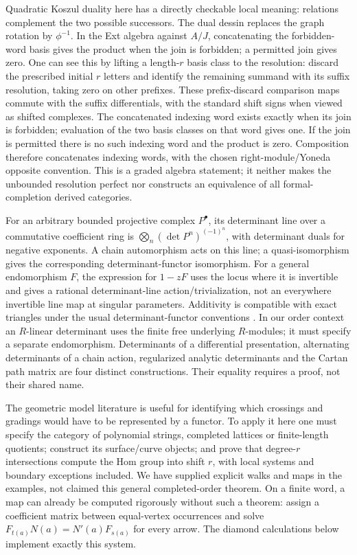 \documentclass[11pt,oneside,openany]{book}
\theoremstyle{definition}\newtheorem{definition}[theorem]{Definition}
\theoremstyle{remark}\newtheorem{remark}[theorem]{Remark}
\begin{document}
Quadratic Koszul duality here has a directly checkable local meaning: relations complement the two possible successors. The dual dessin replaces the graph rotation by $\phi^{-1}$. In the Ext algebra against $A/J$, concatenating the forbidden-word basis gives the product when the join is forbidden; a permitted join gives zero. One can see this by lifting a length-$r$ basis class to the resolution: discard the prescribed initial $r$ letters and identify the remaining summand with its suffix resolution, taking zero on other prefixes. These prefix-discard comparison maps commute with the suffix differentials, with the standard shift signs when viewed as shifted complexes. The concatenated indexing word exists exactly when its join is forbidden; evaluation of the two basis classes on that word gives one. If the join is permitted there is no such indexing word and the product is zero. Composition therefore concatenates indexing words, with the chosen right-module/Yoneda opposite convention. This is a graded algebra statement; it neither makes the unbounded resolution perfect nor constructs an equivalence of all formal-completion derived categories.

For an arbitrary bounded projective complex $P^\bullet$, its determinant line over a commutative coefficient ring is $\bigotimes_n(\det P^n)^{(-1)^n}$, with determinant duals for negative exponents. A chain automorphism acts on this line; a quasi-isomorphism gives the corresponding determinant-functor isomorphism. For a general endomorphism $F$, the expression for $1-zF$ uses the locus where it is invertible and gives a rational determinant-line action/trivialization, not an everywhere invertible line map at singular parameters. Additivity is compatible with exact triangles under the usual determinant-functor conventions \cite{KnudsenMumford,Breuning}. In our order context an $R$-linear determinant uses the finite free underlying $R$-modules; it must specify a separate endomorphism. Determinants of a differential presentation, alternating determinants of a chain action, regularized analytic determinants and the Cartan path matrix are four distinct constructions. Their equality requires a proof, not their shared name.

The geometric model literature \cite{GeometricGentle,GeometricResolutions,GeometricKoszul} is useful for identifying which crossings and gradings would have to be represented by a functor. To apply it here one must specify the category of polynomial strings, completed lattices or finite-length quotients; construct its surface/curve objects; and prove that degree-$r$ intersections compute the Hom group into shift $r$, with local systems and boundary exceptions included. We have supplied explicit walks and maps in the examples, not claimed this general completed-order theorem. On a finite word, a map can already be computed rigorously without such a theorem: assign a coefficient matrix between equal-vertex occurrences and solve $F_{t(a)}N(a)=N'(a)F_{s(a)}$ for every arrow. The diamond calculations below implement exactly this system.
\end{document}
